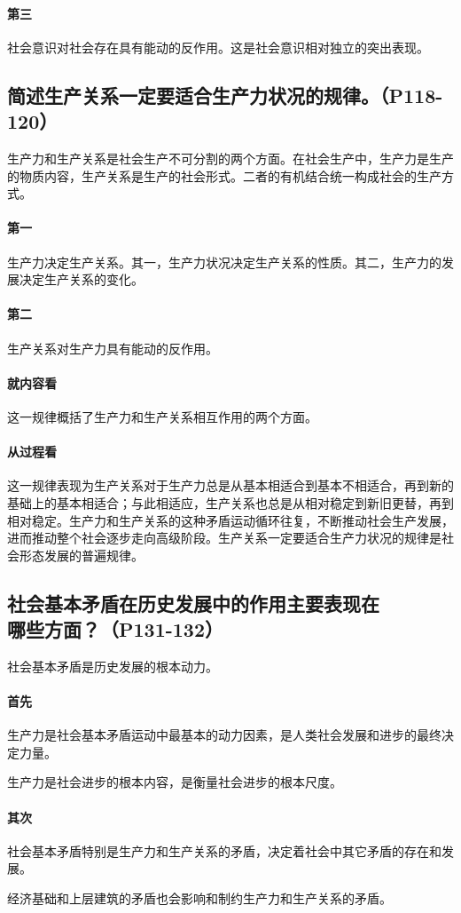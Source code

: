 \documentclass[UTF8]{ctexart}
\begin{document}
			\paragraph{第三}
				社会意识对社会存在具有能动的反作用。这是社会意识相对独立的突出表现。
		\subsection{简述生产关系一定要适合生产力状况的规律。（P118-120）}
			生产力和生产关系是社会生产不可分割的两个方面。在社会生产中，生产力是生产的物质内容，生产关系是生产的社会形式。二者的有机结合统一构成社会的生产方式。
			\paragraph{第一}
				生产力决定生产关系。其一，生产力状况决定生产关系的性质。其二，生产力的发展决定生产关系的变化。
			\paragraph{第二}
				生产关系对生产力具有能动的反作用。
			\paragraph{就内容看}
				这一规律概括了生产力和生产关系相互作用的两个方面。
			\paragraph{从过程看}
				这一规律表现为生产关系对于生产力总是从基本相适合到基本不相适合，再到新的基础上的基本相适合；与此相适应，生产关系也总是从相对稳定到新旧更替，再到相对稳定。生产力和生产关系的这种矛盾运动循环往复，不断推动社会生产发展，进而推动整个社会逐步走向高级阶段。生产关系一定要适合生产力状况的规律是社会形态发展的普遍规律。
		\subsection{社会基本矛盾在历史发展中的作用主要表现在\\哪些方面？（P131-132）}
			社会基本矛盾是历史发展的根本动力。
			\paragraph{首先}
				生产力是社会基本矛盾运动中最基本的动力因素，是人类社会发展和进步的最终决定力量。\par
				生产力是社会进步的根本内容，是衡量社会进步的根本尺度。
			\paragraph{其次}
				社会基本矛盾特别是生产力和生产关系的矛盾，决定着社会中其它矛盾的存在和发展。\par
				经济基础和上层建筑的矛盾也会影响和制约生产力和生产关系的矛盾。
\end{document}
